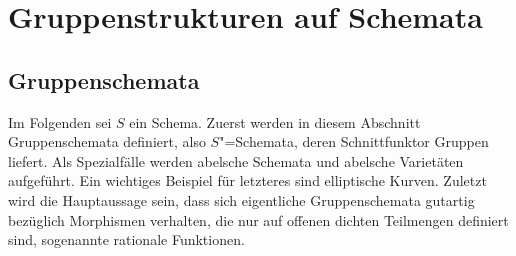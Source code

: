\chapter{Gruppenstrukturen auf Schemata}
\label{chap:gruppenstrukturenaufschemata}
\section{Gruppenschemata}
Im Folgenden sei $S$ ein Schema.
Zuerst werden in diesem Abschnitt Gruppenschemata definiert, also
$S$"=Schemata, deren Schnittfunktor Gruppen liefert. Als Spezialfälle
werden abelsche Schemata und abelsche Varietäten aufgeführt. Ein
wichtiges Beispiel für letzteres sind elliptische Kurven.
Zuletzt wird die Hauptaussage sein, dass sich eigentliche Gruppenschemata
gutartig bezüglich Morphismen verhalten, die nur auf offenen dichten
Teilmengen definiert sind, sogenannte rationale Funktionen.

